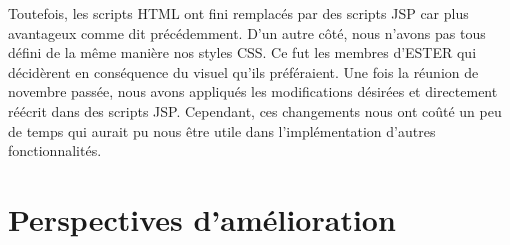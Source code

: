 Toutefois, les scripts HTML ont fini remplacés par des scripts JSP car plus avantageux comme dit précédemment. D'un autre côté, nous n'avons pas tous défini de la même manière nos styles CSS. Ce fut les membres d'ESTER qui décidèrent en conséquence du visuel qu'ils préféraient. Une fois la réunion de novembre passée, nous avons appliqués les modifications désirées et directement réécrit dans des scripts JSP. Cependant, ces changements nous ont coûté un peu de temps qui aurait pu nous être utile dans l'implémentation d'autres fonctionnalités.


\section{Perspectives d'amélioration}

